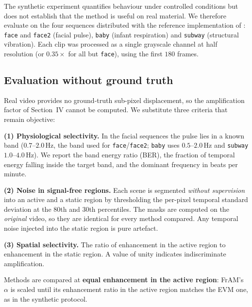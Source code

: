 \documentclass[conference]{IEEEtran}
\begin{document}
The synthetic experiment quantifies behaviour under controlled conditions but
does not establish that the method is useful on real material. We therefore
evaluate on the four sequences distributed with the reference implementation of
\cite{wu2012}: \texttt{face} and \texttt{face2} (facial pulse), \texttt{baby}
(infant respiration) and \texttt{subway} (structural vibration). Each clip was
processed as a single grayscale channel at half resolution (or $0.35\times$ for
all but \texttt{face}), using the first $180$ frames.

\subsection{Evaluation without ground truth}

Real video provides no ground-truth sub-pixel displacement, so the
amplification factor of Section~IV cannot be computed. We substitute three
criteria that remain objective:

\textbf{(1) Physiological selectivity.} In the facial sequences the pulse lies
in a known band ($0.7$--$2.0$\,Hz, the band used for
\texttt{face}/\texttt{face2}; \texttt{baby} uses $0.5$--$2.0$\,Hz and
\texttt{subway} $1.0$--$4.0$\,Hz). We report the band energy ratio (BER),
the fraction of temporal energy falling inside the target band, and the
dominant frequency in beats per minute.

\textbf{(2) Noise in signal-free regions.} Each scene is segmented
\emph{without supervision} into an active and a static region by thresholding
the per-pixel temporal standard deviation at the 80th and 30th percentiles.
The masks are computed on the \emph{original} video, so they are
identical for every method compared. Any temporal noise injected into the
static region is pure artefact.

\textbf{(3) Spatial selectivity.} The ratio of enhancement in the active region
to enhancement in the static region. A value of unity indicates
indiscriminate amplification.

Methods are compared at \textbf{equal enhancement in the active region}:
FrAM's $\alpha$ is scaled until its enhancement ratio in the active region
matches the EVM one, as in the synthetic protocol.
\end{document}
